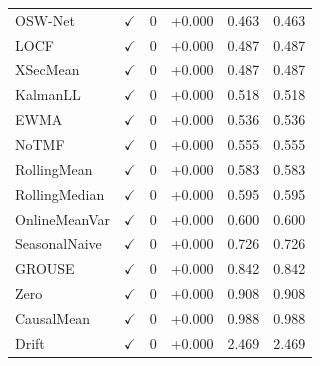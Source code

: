 \begin{table}[t]
\begin{tabular}{@{}lccccc@{}}
OSW-Net & $\checkmark$ & $0$ & +0.000 & 0.463 & 0.463 \\
LOCF & $\checkmark$ & $0$ & +0.000 & 0.487 & 0.487 \\
XSecMean & $\checkmark$ & $0$ & +0.000 & 0.487 & 0.487 \\
KalmanLL & $\checkmark$ & $0$ & +0.000 & 0.518 & 0.518 \\
EWMA & $\checkmark$ & $0$ & +0.000 & 0.536 & 0.536 \\
NoTMF & $\checkmark$ & $0$ & +0.000 & 0.555 & 0.555 \\
RollingMean & $\checkmark$ & $0$ & +0.000 & 0.583 & 0.583 \\
RollingMedian & $\checkmark$ & $0$ & +0.000 & 0.595 & 0.595 \\
OnlineMeanVar & $\checkmark$ & $0$ & +0.000 & 0.600 & 0.600 \\
SeasonalNaive & $\checkmark$ & $0$ & +0.000 & 0.726 & 0.726 \\
GROUSE & $\checkmark$ & $0$ & +0.000 & 0.842 & 0.842 \\
Zero & $\checkmark$ & $0$ & +0.000 & 0.908 & 0.908 \\
CausalMean & $\checkmark$ & $0$ & +0.000 & 0.988 & 0.988 \\
Drift & $\checkmark$ & $0$ & +0.000 & 2.469 & 2.469 \\
\bottomrule
\end{tabular}
\end{table}
